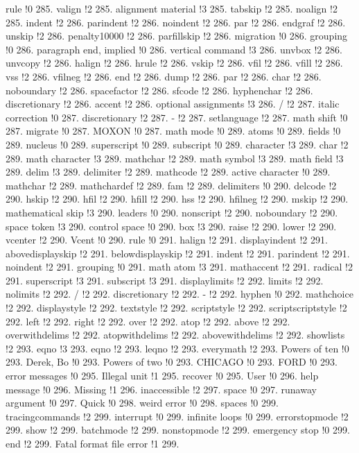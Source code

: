 rule !0 285.
valign !2 285.
alignment material !3 285.
tabskip !2 285.
noalign !2 285.
indent !2 286.
parindent !2 286.
noindent !2 286.
par !2 286.
endgraf !2 286.
unskip !2 286.
penalty10000 !2 286.
parfillskip !2 286.
migration !0 286.
grouping !0 286.
paragraph end, implied !0 286.
vertical command !3 286.
unvbox !2 286.
unvcopy !2 286.
halign !2 286.
hrule !2 286.
vskip !2 286.
vfil !2 286.
vfill !2 286.
vss !2 286.
vfilneg !2 286.
end !2 286.
dump !2 286.
par !2 286.
char !2 286.
noboundary !2 286.
spacefactor !2 286.
sfcode !2 286.
hyphenchar !2 286.
discretionary !2 286.
accent !2 286.
optional assignments !3 286.
/ !2 287.
italic correction !0 287.
discretionary !2 287.
- !2 287.
setlanguage !2 287.
math shift !0 287.
migrate !0 287.
MOXON !0 287.
math mode !0 289.
atoms !0 289.
fields !0 289.
nucleus !0 289.
superscript !0 289.
subscript !0 289.
character !3 289.
char !2 289.
math character !3 289.
mathchar !2 289.
math symbol !3 289.
math field !3 289.
delim !3 289.
delimiter !2 289.
mathcode !2 289.
active character !0 289.
mathchar !2 289.
mathchardef !2 289.
fam !2 289.
delimiters !0 290.
delcode !2 290.
hskip !2 290.
hfil !2 290.
hfill !2 290.
hss !2 290.
hfilneg !2 290.
mskip !2 290.
mathematical skip !3 290.
leaders !0 290.
nonscript !2 290.
noboundary !2 290.
space token !3 290.
control space !0 290.
box !3 290.
raise !2 290.
lower !2 290.
vcenter !2 290.
Vcent !0 290.
rule !0 291.
halign !2 291.
displayindent !2 291.
abovedisplayskip !2 291.
belowdisplayskip !2 291.
indent !2 291.
parindent !2 291.
noindent !2 291.
grouping !0 291.
math atom !3 291.
mathaccent !2 291.
radical !2 291.
superscript !3 291.
subscript !3 291.
displaylimits !2 292.
limits !2 292.
nolimits !2 292.
/ !2 292.
discretionary !2 292.
- !2 292.
hyphen !0 292.
mathchoice !2 292.
displaystyle !2 292.
textstyle !2 292.
scriptstyle !2 292.
scriptscriptstyle !2 292.
left !2 292.
right !2 292.
over !2 292.
atop !2 292.
above !2 292.
overwithdelims !2 292.
atopwithdelims !2 292.
abovewithdelims !2 292.
showlists !2 293.
eqno !3 293.
eqno !2 293.
leqno !2 293.
everymath !2 293.
Powers of ten !0 293.
Derek, Bo !0 293.
Powers of two !0 293.
CHICAGO !0 293.
FORD !0 293.
error messages !0 295.
Illegal unit !1 295.
recover !0 295.
User !0 296.
help message !0 296.
Missing !1 296.
inaccessible !2 297.
space !0 297.
runaway argument !0 297.
Quick !0 298.
weird error !0 298.
spaces !0 299.
tracingcommands !2 299.
interrupt !0 299.
infinite loops !0 299.
errorstopmode !2 299.
show !2 299.
batchmode !2 299.
nonstopmode !2 299.
emergency stop !0 299.
end !2 299.
Fatal format file error !1 299.
